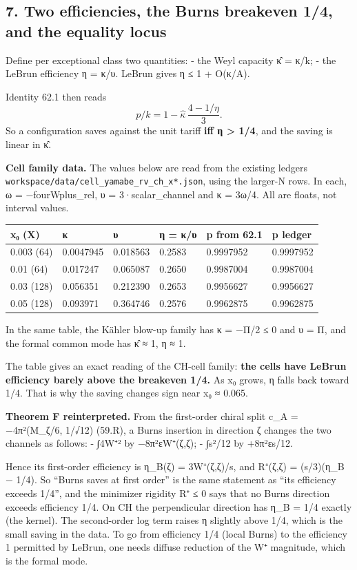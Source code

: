 \documentclass[
  10pt,
]{report}
\begin{document}
\hypertarget{two-efficiencies-the-burns-breakeven-14-and-the-equality-locus}{%
\subsection{7. Two efficiencies, the Burns breakeven 1/4, and the
equality
locus}\label{two-efficiencies-the-burns-breakeven-14-and-the-equality-locus}}

Define per exceptional class two quantities: - the Weyl capacity κ̂ =
κ/k; - the LeBrun efficiency η = κ/υ. LeBrun gives η ≤ 1 + O(κ/A).

Identity 62.1 then reads \[
p/k = 1-\hat\kappa\,\frac{4-1/\eta}{3}.
\] So a configuration saves against the unit tariff \textbf{iff η
\textgreater{} 1/4}, and the saving is linear in κ̂.

\textbf{Cell family data.} The values below are read from the existing
ledgers \texttt{workspace/data/cell\_yamabe\_rv\_ch\_x*.json}, using the
larger-N rows. In each, ω = −fourWplus\_rel, υ = 3·scalar\_channel and κ
= 3ω/4. All are floats, not interval values.

\begin{longtable}[]{@{}llllll@{}}
\toprule
x₀ (X) & κ & υ & η = κ/υ & p from 62.1 & p ledger\tabularnewline
\midrule
\endhead
0.003 (64) & 0.0047945 & 0.018563 & 0.2583 & 0.9997952 &
0.9997952\tabularnewline
0.01 (64) & 0.017247 & 0.065087 & 0.2650 & 0.9987004 &
0.9987004\tabularnewline
0.03 (128) & 0.056351 & 0.212390 & 0.2653 & 0.9956627 &
0.9956627\tabularnewline
0.05 (128) & 0.093971 & 0.364746 & 0.2576 & 0.9962875 &
0.9962875\tabularnewline
\bottomrule
\end{longtable}

In the same table, the Kähler blow-up family has κ = −Π/2 ≤ 0 and υ = Π,
and the formal common mode has κ̂ ≈ 1, η ≈ 1.

The table gives an exact reading of the CH-cell family: \textbf{the
cells have LeBrun efficiency barely above the breakeven 1/4.} As x₀
grows, η falls back toward 1/4. That is why the saving changes sign near
x₀ ≈ 0.065.

\textbf{Theorem F reinterpreted.} From the first-order chiral split c\_A
= −4π²(M\_ζ/6, 1/√12) (59.R), a Burns insertion in direction ζ changes
the two channels as follows: - ∫4\textbar W⁺\textbar² by −8π²εW⁺(ζ,ζ); -
∫s²/12 by +8π²ε\textbar s\textbar/12.

Hence its first-order efficiency is η\_B(ζ) =
3W⁺(ζ,ζ)/\textbar s\textbar, and R⁺(ζ,ζ) = (\textbar s\textbar/3)(η\_B −
1/4). So ``Burns saves at first order'' is the same statement as ``its
efficiency exceeds 1/4'', and the minimizer rigidity R⁺ ≤ 0 says that no
Burns direction exceeds efficiency 1/4. On CH the perpendicular
direction has η\_B = 1/4 exactly (the kernel). The second-order log term
raises η slightly above 1/4, which is the small saving in the data. To
go from efficiency 1/4 (local Burns) to the efficiency 1 permitted by
LeBrun, one needs diffuse reduction of the \textbar W⁺\textbar{}
magnitude, which is the formal mode.
\end{document}
